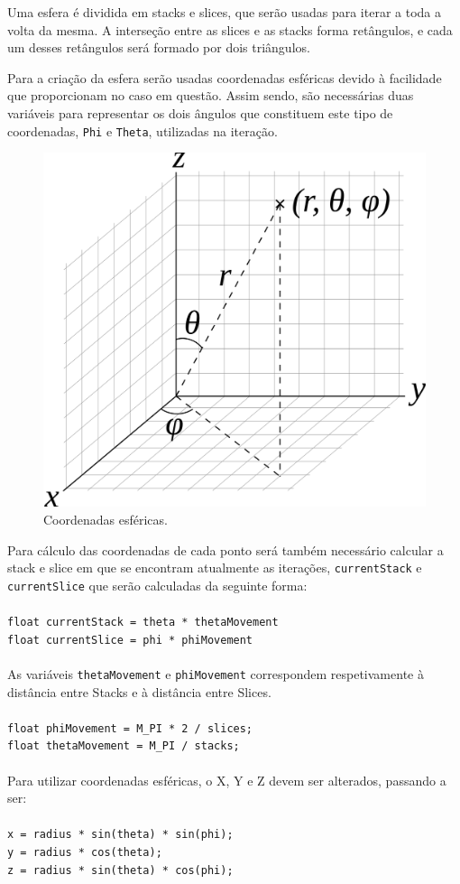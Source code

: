 \documentclass[a4paper]{article}
\begin{document}
Uma esfera é dividida em stacks e slices, que serão usadas para iterar a toda a volta da mesma. A interseção entre as slices e as stacks forma retângulos, e cada um desses retângulos será formado por dois triângulos.


Para a criação da esfera serão usadas coordenadas esféricas devido à facilidade que proporcionam no caso em questão. Assim sendo, são necessárias duas variáveis para representar os dois ângulos que constituem este tipo de coordenadas, \texttt{Phi} e \texttt{Theta}, utilizadas na iteração.

\begin{figure}[H]
\centering
\includegraphics[width=0.5\linewidth]{coords.png}
\caption{Coordenadas esféricas.}
\end{figure}

Para cálculo das coordenadas de cada ponto será também necessário calcular a stack e slice em que se encontram atualmente as iterações, \texttt{currentStack} e \texttt{currentSlice} que serão calculadas da seguinte forma:\\
\\
\texttt{float currentStack = theta * thetaMovement}\\
\texttt{float currentSlice = phi * phiMovement}\\
\\

As variáveis \texttt{thetaMovement} e \texttt{phiMovement} correspondem respetivamente à distância entre Stacks e à distância entre Slices.\\
\\
\texttt{float phiMovement = M\_PI * 2 / slices;}\\
\texttt{float thetaMovement = M\_PI / stacks;}\\
\\

Para utilizar coordenadas esféricas, o X, Y e Z devem ser alterados, passando a ser:\\
\\
\texttt{x = radius * sin(theta) * sin(phi);}\\
\texttt{y = radius * cos(theta);}\\
\texttt{z = radius * sin(theta) * cos(phi);}\\
\end{document}
